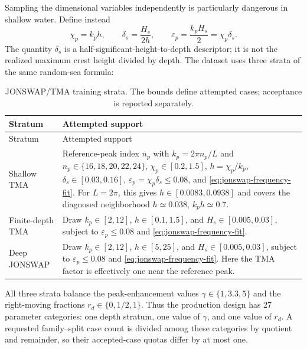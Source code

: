 \documentclass[11pt]{article}
\newcommand{\eps}{\varepsilon}
\begin{document}
Sampling the dimensional variables independently is particularly dangerous
in shallow water.  Define instead
\begin{equation}
  \chi_p=k_ph,\qquad
  \delta_s=\frac{H_s}{2h},\qquad
  \eps_p=\frac{k_pH_s}{2}=\chi_p\delta_s.
  \label{eq:sea-dimensionless-identity}
\end{equation}
The quantity $\delta_s$ is a half-significant-height-to-depth descriptor; it is not
the realized maximum crest height divided by depth.  The dataset uses
three strata of the same random-sea formula:
\begin{longtable}{>{\raggedright\arraybackslash}p{}
                  >{\raggedright\arraybackslash}p{}}
  \caption{JONSWAP/TMA training strata.  The bounds define attempted
  cases; acceptance is reported separately.}
  \label{tab:jonswap-strata}\\
  \toprule
  Stratum & Attempted support \\
  \midrule
  \endfirsthead
  \toprule
  Stratum & Attempted support \\
  \midrule
  \endhead
  Shallow TMA
    & Reference-peak index $n_p$ with $k_p=2\pi n_p/L$ and
      $n_p\in\{16,18,20,22,24\}$,
      $\chi_p\in[0.2,1.5]$, $h=\chi_p/k_p$,
      $\delta_s\in[0.03,0.16]$, $\eps_p=\chi_p\delta_s\leq0.08$, and
      \eqref{eq:jonswap-frequency-fit}.
      For $L=2\pi$, this gives $h\in[0.0083,0.0938]$ and covers the
      diagnosed neighborhood $h\simeq0.038$, $k_ph\simeq0.7$. \\
  Finite-depth TMA
    & Draw $k_p\in[2,12]$, $h\in[0.1,1.5]$, and
      $H_s\in[0.005,0.03]$, subject to $\eps_p\leq0.08$ and
      \eqref{eq:jonswap-frequency-fit}. \\
  Deep JONSWAP
    & Draw $k_p\in[2,12]$, $h\in[5,25]$, and
      $H_s\in[0.005,0.03]$, subject to $\eps_p\leq0.08$ and
      \eqref{eq:jonswap-frequency-fit}.  Here the TMA
      factor is effectively one near the reference peak. \\
  \bottomrule
\end{longtable}
All three strata balance the peak-enhancement values
$\gamma\in\{1,3.3,5\}$ and the right-moving fractions
$r_d\in\{0,1/2,1\}$.  Thus the production design has 27 parameter categories:
one depth
stratum, one value of $\gamma$, and one value of $r_d$.  A requested
family--split case count is divided among these categories by quotient and
remainder, so their accepted-case quotas differ by at most one.
\end{document}
